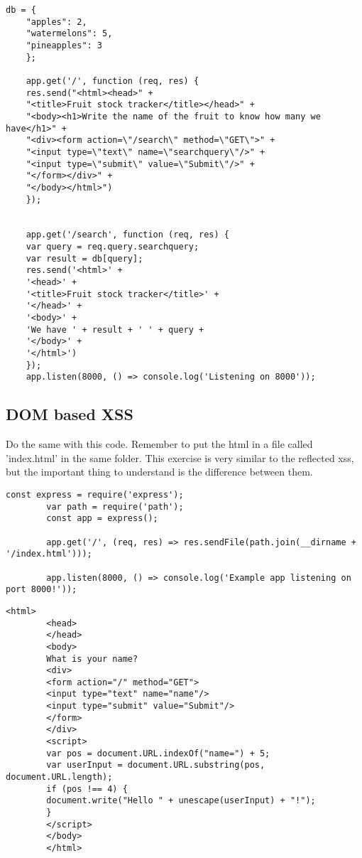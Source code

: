 \begin{Exercise}[label={websec-xss-types}]
\begin{lstlisting}[style=JavaScript]
	db = {
	"apples": 2,
	"watermelons": 5,
	"pineapples": 3
	};
	
	app.get('/', function (req, res) {
	res.send("<html><head>" +
	"<title>Fruit stock tracker</title></head>" +
	"<body><h1>Write the name of the fruit to know how many we have</h1>" +
	"<div><form action=\"/search\" method=\"GET\">" +
	"<input type=\"text\" name=\"searchquery\"/>" +
	"<input type=\"submit\" value=\"Submit\"/>" +
	"</form></div>" +
	"</body></html>")
	});
	
	
	app.get('/search', function (req, res) {
	var query = req.query.searchquery;
	var result = db[query];
	res.send('<html>' +
	'<head>' +
	'<title>Fruit stock tracker</title>' +
	'</head>' +
	'<body>' +
	'We have ' + result + ' ' + query +
	'</body>' +
	'</html>')
	});
	app.listen(8000, () => console.log('Listening on 8000'));
	\end{lstlisting}
	

	\subsection{DOM based XSS}
		Do the same with this code. Remember to put the html in a file called 'index.html' in the same folder. This exercise is very similar to the reflected xss, but the important thing to understand is the difference between them.
		\begin{lstlisting}[style=JavaScript]
		const express = require('express');
		var path = require('path');
		const app = express();
		
		app.get('/', (req, res) => res.sendFile(path.join(__dirname + '/index.html')));
		
		app.listen(8000, () => console.log('Example app listening on port 8000!'));
		\end{lstlisting}
		\begin{lstlisting}[style=JavaScript]
		<html>
		<head>
		</head>
		<body>
		What is your name?
		<div>
		<form action="/" method="GET">
		<input type="text" name="name"/>
		<input type="submit" value="Submit"/>
		</form>
		</div>
		<script>
		var pos = document.URL.indexOf("name=") + 5;
		var userInput = document.URL.substring(pos, document.URL.length);
		if (pos !== 4) {
		document.write("Hello " + unescape(userInput) + "!");
		}
		</script>
		</body>
		</html>
		\end{lstlisting}
\end{Exercise}
